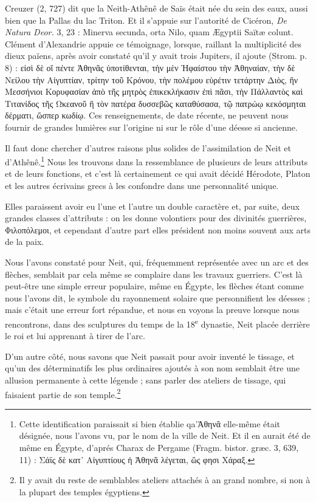 \documentclass[letterpaper,twocolumn,openany,nodeprecatedcode]{dndbook}
\begin{document}
Creuzer (2, 727) dit que la Neith-Athênê de Saïs était née du sein des eaux, aussi bien que la Pallas du lac Triton. Et il s'appuie sur l'autorité de Cicéron, \emph{De Natura Deor.} 3, 23 : Minerva secunda, orta Nilo, quam Ægyptii Saïtæ colunt. Clément d'Alexandrie appuie ce témoignage, lorsque, raillant la multiplicité des dieux païens, après avoir constaté qu'il y avait trois Jupiters, il ajoute (Strom. p. 8) : εἰσὶ δὲ οἵ πέντε Ἀθηνᾶς ὑποτίθενται, τὴν μὲν Ἡφαίστου τὴν Ἀθηναίαν, τὴν δὲ Νείλου τὴν Αἰγυπτίαν, τρίτην τοῦ Κρόνου, τὴν πολέμου εὑρέτιν τετάρτην Διὸς, ἣν Μεσσήνιοι Κορυφασίαν ἀπὸ τῆς μητρὸς ἐπικεκλήκασιν ἐπὶ πᾶσι, τὴν Πάλλαντὸς καὶ Τιτανίδος τῆς Ωκεανοῦ ἣ τὸν πατέρα δυσσεβῶς καταθύσασα, τῷ πατρώῳ κεκόσμηται δέρματι, ὥσπερ κωδίῳ. Ces renseignements, de date récente, ne peuvent nous fournir de grandes lumières sur l'origine ni sur le rôle d'une déesse si ancienne.

Il faut donc chercher d'autres raisons plus solides de l'assimilation de Neit et d'Athênê.\footnote{Cette identification paraissait si bien établie qa'Ἀθηνᾶ elle-même était désignée, nous l'avons vu, par le nom de la ville de Neit. Et il en aurait été de même en Égypte, d'aprés Charax de Pergame (Fragm. bistor. græc. 3, 639, 11) : Σάϊς δὲ κατ᾽ Αἰγυπτίους ἡ Ἀθηνᾶ λέγεται, ὥς φησι Χάραξ.} Nous les trouvons dans la ressemblance de plusieurs de leurs attributs et de leurs fonctions, et c'est là certainement ce qui avait décidé Hérodote, Platon et les autres écrivains grecs à les confondre dans une personnalité unique.

Elles paraissent avoir eu l'une et l'autre un double caractère et, par suite, deux grandes classes d'attributs : on les donne volontiers pour des divinités guerrières, Φιλοπόλεμοι, et cependant d'autre part elles président non moins souvent aux arts de la paix.

Nous l'avons constaté pour Neit, qui, fréquemment représentée avec un arc et des flèches, semblait par cela même se complaire dans les travaux guerriers. C'est là peut-être une simple erreur populaire, même en Égypte, les flèches étant comme nous l'avons dit, le symbole du rayonnement solaire que personnifient les déesses ; mais c'était une erreur fort répandue, et nous en voyons la preuve lorsque nous rencontrons, dans des sculptures du temps de la 18\textsuperscript{e} dynastie, Neit placée derrière le roi et lui apprenant à tirer de l'arc.

D'un autre côté, nous savons que Neit passait pour avoir inventé le tissage, et qu'un des déterminatifs les plus ordinaires ajoutés à son nom semblait être une allusion permanente à cette légende ; sans parler des ateliers de tissage, qui faisaient partie de son temple.\footnote{Il y avait du reste de semblables ateliers attachés à an grand nombre, si non à la plupart des temples égyptiens.}
\end{document}
